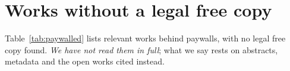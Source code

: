 \section{Works without a legal free copy}\label{app:paywalled}
Table~\ref{tab:paywalled} lists relevant works behind paywalls, with no legal free copy found. \emph{We have not read
them in full}; what we say rests on abstracts, metadata and the open works cited instead.

